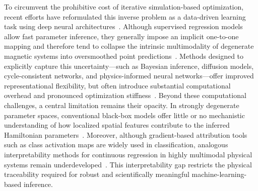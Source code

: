 \documentclass[a4paper,fleqn]{cas-sc}
\begin{document}
To circumvent the prohibitive cost of iterative simulation-based optimization, recent efforts have reformulated this inverse problem as a data-driven learning task using deep neural architectures~\cite{lee2024deep}. Although supervised regression models allow fast parameter inference, they generally impose an implicit one-to-one mapping and therefore tend to collapse the intrinsic multimodality of degenerate magnetic systems into oversmoothed point predictions~\cite{chen2024data}. Methods designed to explicitly capture this uncertainty—such as Bayesian inference, diffusion models, cycle-consistent networks, and physics-informed neural networks—offer improved representational flexibility, but often introduce substantial computational overhead and pronounced optimization stiffness~\cite{lan2022scaling, huang2023cycle, baldan2023physics}. Beyond these computational challenges, a central limitation remains their opacity. In strongly degenerate parameter spaces, conventional black-box models offer little or no mechanistic understanding of how localized spatial features contribute to the inferred Hamiltonian parameters~\cite{wang2021learning, vcadevz2026neural}. Moreover, although gradient-based attribution tools such as class activation maps are widely used in classification, analogous interpretability methods for continuous regression in highly multimodal physical systems remain underdeveloped~\cite{he2022survey}. This interpretability gap restricts the physical traceability required for robust and scientifically meaningful machine-learning-based inference.
\end{document}
